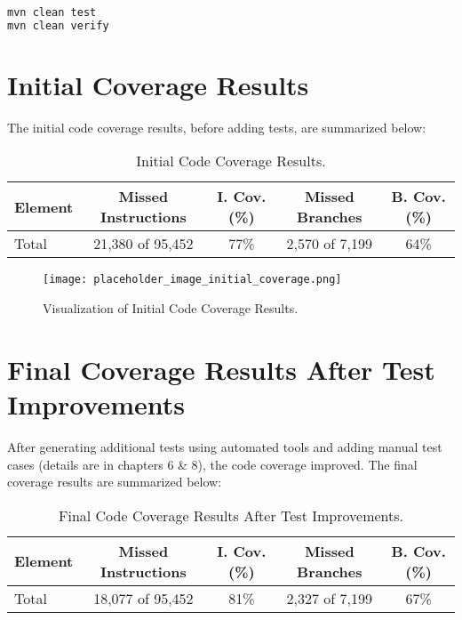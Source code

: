 \documentclass[a4paper,12pt]{report}
\begin{document}
\begin{lstlisting}[language=bash, caption=Commands to Generate Code Coverage Reports]
mvn clean test
mvn clean verify
\end{lstlisting}

\section{Initial Coverage Results}
The initial code coverage results, before adding tests, are summarized below:

\begin{table}[H]
    \centering
    \begin{tabular}{|l|c|c|c|c|}
        \hline
        \textbf{Element} & \textbf{Missed Instructions} & \textbf{I. Cov. (\%)} & \textbf{Missed Branches} & \textbf{B. Cov. (\%)} \\ \hline
        Total & 21,380 of 95,452 & 77\% & 2,570 of 7,199 & 64\% \\ \hline
    \end{tabular}
    \caption{Initial Code Coverage Results.}
    \label{tab:initial_coverage}
\end{table}

\begin{figure}[H]
    \centering
    \texttt{[image: placeholder\_image\_initial\_coverage.png]} %
    \caption{Visualization of Initial Code Coverage Results.}
    \label{fig:initial_coverage_visualization}
\end{figure}

\section{Final Coverage Results After Test Improvements}
After generating additional tests using automated tools and adding manual test cases (details are in chapters 6 & 8), the code coverage improved. The final coverage results are summarized below:

\begin{table}[H]
    \centering
    \begin{tabular}{|l|c|c|c|c|}
        \hline
        \textbf{Element} & \textbf{Missed Instructions} & \textbf{I. Cov. (\%)} & \textbf{Missed Branches} & \textbf{B. Cov. (\%)} \\ \hline
        Total & 18,077 of 95,452 & 81\% & 2,327 of 7,199 & 67\% \\ \hline
    \end{tabular}
    \caption{Final Code Coverage Results After Test Improvements.}
    \label{tab:final_coverage}
\end{table}
\end{document}
